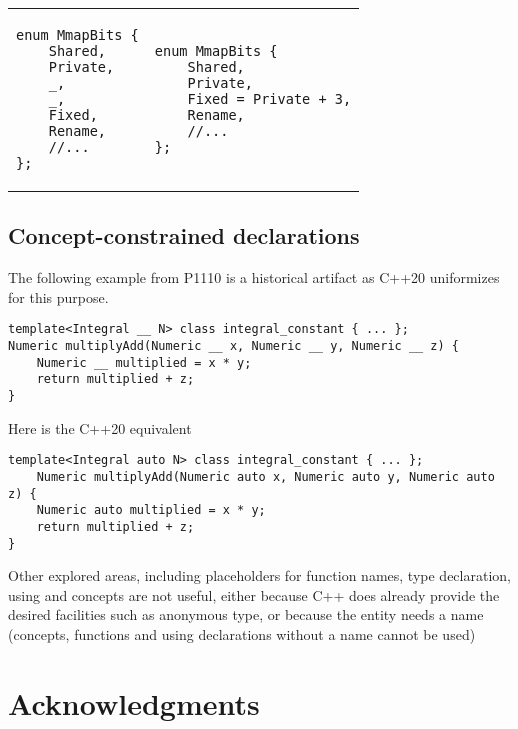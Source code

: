 \documentclass{wg21}
\begin{document}
{\begin{center}
\begin{tabular}{l|l}
\begin{minipage}[t]{0.5\textwidth}
\begin{lstlisting}[style=color]
enum MmapBits {
    Shared,
    Private,
    _,
    _,
    Fixed,
    Rename,
    //...
};

\end{lstlisting}
\end{minipage}
&
\begin{minipage}[t]{0.5\textwidth}
\begin{lstlisting}[style=color]
enum MmapBits {
    Shared,
    Private,
    Fixed = Private + 3,
    Rename,
    //...
};

\end{lstlisting}
\end{minipage}
\end{tabular}
\end{center}

\subsection{Concept-constrained declarations}

The following example from P1110 is a historical artifact as C++20 uniformizes  for this purpose.

\begin{lstlisting}[style=color]
template<Integral __ N> class integral_constant { ... };
Numeric multiplyAdd(Numeric __ x, Numeric __ y, Numeric __ z) {
    Numeric __ multiplied = x * y;
    return multiplied + z;
}
\end{lstlisting}

Here is the C++20 equivalent

\begin{lstlisting}[style=color]
template<Integral auto N> class integral_constant { ... };
    Numeric multiplyAdd(Numeric auto x, Numeric auto y, Numeric auto z) {
    Numeric auto multiplied = x * y;
    return multiplied + z;
}
\end{lstlisting}


Other explored areas, including placeholders for function names, type declaration, using and concepts are not
useful, either because C++ does already provide the desired facilities such as anonymous type, or because the entity needs a name
(concepts, functions and using declarations without a name cannot be used)

\section{Acknowledgments}

}
\end{document}
